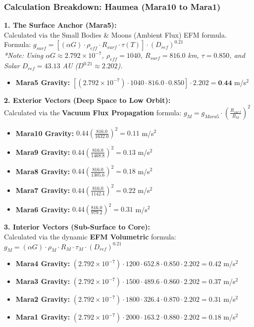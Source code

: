 \documentclass[11pt, a4paper]{article}
\begin{document}
\clearpage
\subsubsection{Calculation Breakdown: Haumea (Mara10 to Mara1)}

\noindent \textbf{1. The Surface Anchor (Mara5):} \\
Calculated via the Small Bodies \& Moons (Ambient Flux) EFM formula. \\
Formula: $g_{surf} = \left[ (\alpha G) \cdot \rho_{eff} \cdot R_{surf} \cdot \tau(T) \right] \cdot (D_{ref})^{0.21}$ \\
\textit{*Note: Using $\alpha G \approx 2.792 \times 10^{-7}$, $\rho_{eff} = 1040$, $R_{surf} = 816.0$ km, $\tau = 0.850$, and Solar $D_{ref} = 43.13$ AU ($D^{0.21} \approx 2.202$).}
\begin{itemize}
  \item \textbf{Mara5 Gravity:} $\left[ (2.792 \times 10^{-7}) \cdot 1040 \cdot 816.0 \cdot 0.850 \right] \cdot 2.202 = \textbf{0.44}$ m/s$^2$
\end{itemize}

\vspace{0.5em}
\noindent \textbf{2. Exterior Vectors (Deep Space to Low Orbit):} \\
Calculated via the \textbf{Vacuum Flux Propagation} formula: $g_M = g_{Mara5} \cdot \left( \frac{R_{surf}}{R_M} \right)^2$
\begin{itemize}
  \item \textbf{Mara10 Gravity:} $0.44 \left( \frac{816.0}{1632.0} \right)^2 = 0.11$ m/s$^2$
  \item \textbf{Mara9 Gravity:} $0.44 \left( \frac{816.0}{1468.8} \right)^2 = 0.13$ m/s$^2$
  \item \textbf{Mara8 Gravity:} $0.44 \left( \frac{816.0}{1305.6} \right)^2 = 0.18$ m/s$^2$
  \item \textbf{Mara7 Gravity:} $0.44 \left( \frac{816.0}{1142.4} \right)^2 = 0.22$ m/s$^2$
  \item \textbf{Mara6 Gravity:} $0.44 \left( \frac{816.0}{979.2} \right)^2 = 0.31$ m/s$^2$
\end{itemize}

\vspace{0.5em}
\noindent \textbf{3. Interior Vectors (Sub-Surface to Core):} \\
Calculated via the dynamic \textbf{EFM Volumetric} formula: $g_M = (\alpha G) \cdot \rho_{M} \cdot R_M \cdot \tau_M \cdot (D_{ref})^{0.21}$
\begin{itemize}
  \item \textbf{Mara4 Gravity:} $(2.792 \times 10^{-7}) \cdot 1200 \cdot 652.8 \cdot 0.850 \cdot 2.202 = 0.42$ m/s$^2$
  \item \textbf{Mara3 Gravity:} $(2.792 \times 10^{-7}) \cdot 1500 \cdot 489.6 \cdot 0.860 \cdot 2.202 = 0.37$ m/s$^2$
  \item \textbf{Mara2 Gravity:} $(2.792 \times 10^{-7}) \cdot 1800 \cdot 326.4 \cdot 0.870 \cdot 2.202 = 0.31$ m/s$^2$
  \item \textbf{Mara1 Gravity:} $(2.792 \times 10^{-7}) \cdot 2000 \cdot 163.2 \cdot 0.880 \cdot 2.202 = 0.18$ m/s$^2$
\end{itemize}
\end{document}
